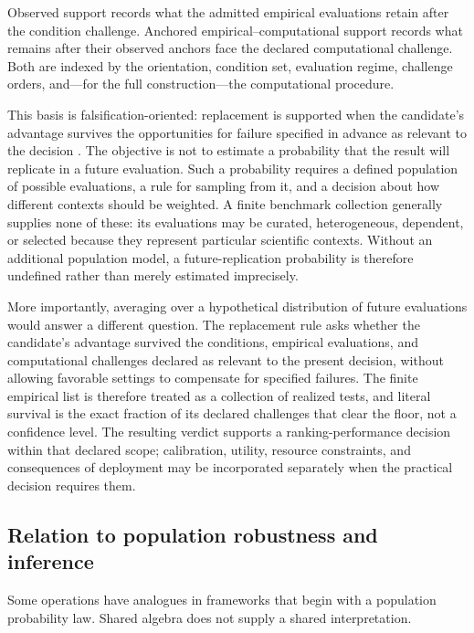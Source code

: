 \documentclass[11pt]{article}
\theoremstyle{remark}
\begin{document}
Observed support records what the admitted empirical evaluations retain after
the condition challenge. Anchored empirical--computational support records what
remains after their observed anchors face the declared computational challenge.
Both are indexed by the orientation, condition set, evaluation regime,
challenge orders, and---for the full construction---the computational
procedure.

This basis is falsification-oriented: replacement is supported when the
candidate's advantage survives the opportunities for failure specified in
advance as relevant to the decision
\cite{popper1959logic,popper1963conjectures}. The objective is not to estimate
a probability that the result will replicate in a future evaluation. Such a
probability requires a defined population of possible evaluations, a rule for
sampling from it, and a decision about how different contexts should be
weighted. A finite benchmark collection generally supplies none of these:
its evaluations may be curated, heterogeneous, dependent, or selected because
they represent particular scientific contexts. Without an additional
population model, a future-replication probability is therefore undefined
rather than merely estimated imprecisely.

More importantly, averaging over a hypothetical distribution of future
evaluations would answer a different question. The replacement rule asks
whether the candidate's advantage survived the conditions, empirical
evaluations, and computational challenges declared as relevant to the present
decision, without allowing favorable settings to compensate for specified
failures. The finite empirical list is therefore treated as a collection of
realized tests, and literal survival is the exact fraction of its declared
challenges that clear the floor, not a confidence level. The resulting verdict
supports a ranking-performance decision within that declared scope;
calibration, utility, resource constraints, and consequences of deployment may
be incorporated separately when the practical decision requires them.

\subsection{Relation to population robustness and inference}
\label{sec:related-frameworks}

Some operations have analogues in frameworks that begin with a population
probability law. Shared algebra does not supply a shared interpretation.
\end{document}
